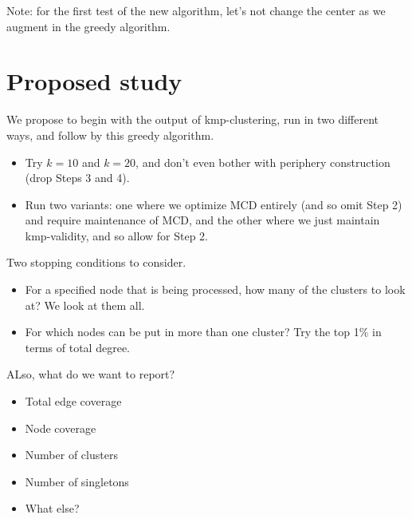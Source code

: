 \documentclass{article}
\begin{document}
Note: for the first test of the new algorithm, let's not change the center as we augment in the greedy algorithm. 


\section{Proposed study}
We propose to begin with the output of kmp-clustering, run in two different ways, and follow by this greedy algorithm.

\begin{itemize}
\item Try $k=10$ and $k=20$, and don't even bother with periphery construction (drop Steps 3 and 4).
\item Run two variants: one where we optimize MCD entirely (and so omit Step 2) and require maintenance of MCD, and the other where we just maintain kmp-validity, and so allow for Step 2.

\end{itemize}

Two stopping conditions to consider.
\begin{itemize}
\item For a specified node that is being processed, how many of the clusters to look at? We look at them all.
\item For which nodes can be put in more than one cluster?  Try the top 1\% in terms of total degree. 
\end{itemize}




ALso, what do we want to report?
\begin{itemize}
\item Total edge coverage
\item Node coverage
\item Number of clusters
\item Number of singletons
\item What else?
\end{itemize}
\end{document}
